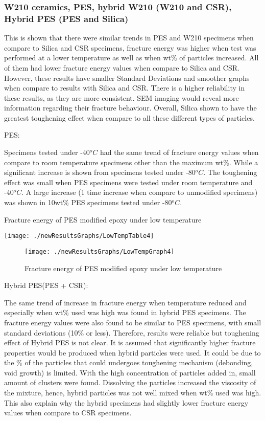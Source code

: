 \documentclass[numbers=noendperiod,chapterprefix=on]{icldt} %
\begin{document}
\subsubsection{W210 ceramics, PES, hybrid W210 (W210 and CSR), Hybrid PES (PES and Silica)}
This is shown that there were similar trends in PES and W210 specimens when compare to Silica and CSR specimens, fracture energy was higher when test was performed at a lower temperature as well as when wt\% of particles increased. All of them had lower fracture energy values when compare to Silica and CSR. However, these results have smaller Standard Deviations and smoother graphs when compare to results with Silica and CSR. There is a higher reliability in these results, as they are more consistent. SEM imaging would reveal more information regarding their fracture behaviour. Overall, Silica shown to have the greatest toughening effect when compare to all these different types of particles.

PES:

Specimens tested under -40$^oC$ had the same trend of fracture energy values when compare to room temperature specimens other than the maximum wt\%. While a significant increase is shown from specimens tested under -80$^oC$. The toughening effect was small when PES specimens were tested under room temperature and -40$^oC$. A large increase (1 time increase when compare to unmodified specimens) was shown in 10wt\% PES specimens tested under -80$^oC$. 

\begin{table}[!hp]
\centering
\caption{Fracture energy of PES modified epoxy under low temperature} %
\texttt{[image: ./newResultsGraphs/LowTempTable4]}
\end{table}
\FloatBarrier

\begin{figure}[!hp]
\centering
\texttt{[image: ./newResultsGraphs/LowTempGraph4]}
\caption{Fracture energy of PES modified epoxy under low temperature}
\end{figure}
\FloatBarrier
\newpage
Hybrid PES(PES + CSR):

The same trend of increase in fracture energy when temperature reduced and especially when wt\% used was high was found in hybrid PES specimens. The fracture energy values were also found to be similar to PES specimens, with small standard deviations (10\% or less). Therefore, results were reliable but toughening effect of Hybrid PES is not clear. It is assumed that significantly higher fracture properties would be produced when hybrid particles were used. It could be due to the \% of the particles that could undergoes toughening mechanism (debonding, void growth) is limited. With the high concentration of particles added in, small amount of clusters were found. Dissolving the particles increased the viscosity of the mixture, hence, hybrid particles was not well mixed when wt\% used was high. This also explain why the hybrid specimens had slightly lower fracture energy values when compare to CSR specimens.
\end{document}
